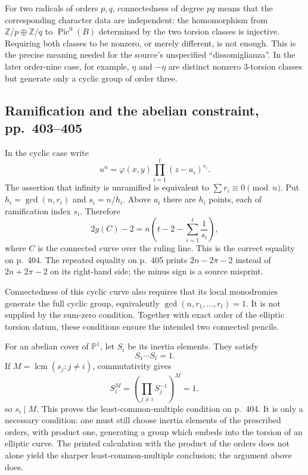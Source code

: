 For two radicals of orders $p,q$, connectedness of degree $pq$ means that the corresponding character data are independent: the homomorphism from $\mathbb Z/p\oplus\mathbb Z/q$ to $\operatorname{Pic}^0(B)$ determined by the two torsion classes is injective. Requiring both classes to be nonzero, or merely different, is not enough. This is the precise meaning needed for the source's unspecified ``dissomiglianza''. In the later order-nine case, for example, $\eta$ and $-\eta$ are distinct nonzero $3$-torsion classes but generate only a cyclic group of order three.

\subsection{Ramification and the abelian constraint, pp.~403--405}

In the cyclic case write
\[
 u^n=\varphi(x,y)\prod_{i=1}^t(z-a_i)^{r_i}.
\]
The assertion that infinity is unramified is equivalent to $\sum r_i\equiv0\pmod n$. Put $h_i=\gcd(n,r_i)$ and $s_i=n/h_i$. Above $a_i$ there are $h_i$ points, each of ramification index $s_i$. Therefore
\begin{equation}
\label{cp2-x-rh}
 2g(C)-2=n\left(t-2-\sum_{i=1}^t\frac1{s_i}\right),
\end{equation}
where $C$ is the connected curve over the ruling line. This is the correct equality on p.~404. The repeated equality on p.~405 prints $2n-2\pi-2$ instead of $2n+2\pi-2$ on its right-hand side; the minus sign is a source misprint.

Connectedness of this cyclic curve also requires that its local monodromies generate the full cyclic group, equivalently $\gcd(n,r_1,\ldots,r_t)=1$. It is not supplied by the sum-zero condition. Together with exact order of the elliptic torsion datum, these conditions ensure the intended two connected pencils.

For an abelian cover of $\mathbb P^1$, let $S_i$ be its inertia elements. They satisfy
\[
 S_1\cdots S_t=1.
\]
If $M=\operatorname{lcm}(s_j:j\ne i)$, commutativity gives
\[
 S_i^M=\left(\prod_{j\ne i}S_j^{-1}\right)^M=1,
\]
so $s_i\mid M$. This proves the least-common-multiple condition on p.~404. It is only a necessary condition: one must still choose inertia elements of the prescribed orders, with product one, generating a group which embeds into the torsion of an elliptic curve. The printed calculation with the product of the orders does not alone yield the sharper least-common-multiple conclusion; the argument above does.

